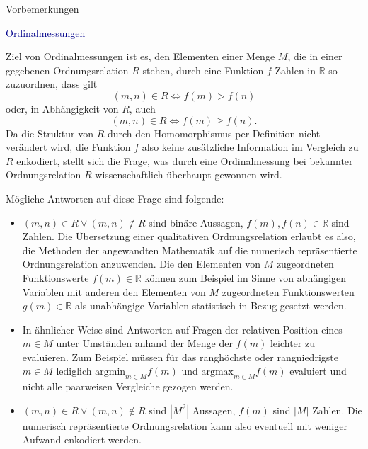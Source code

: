 \documentclass[
  8pt,
  ignorenonframetext,
]{beamer}
\providecommand{\tightlist}{%
  \setlength{\itemsep}{0pt}\setlength{\parskip}{0pt}}
\begin{document}
\begin{frame}{Vorbemerkungen}
\protect\hypertarget{vorbemerkungen-3}{}
\vspace{1mm}

\textcolor{darkblue}{Ordinalmessungen}

\footnotesize

Ziel von Ordinalmessungen ist es, den Elementen einer Menge \(M\), die
in einer gegebenen Ordnungsrelation \(R\) stehen, durch eine Funktion
\(f\) Zahlen in \(\mathbb{R}\) so zuzuordnen, dass gilt \begin{equation}
(m,n) \in R \Leftrightarrow f(m) > f(n)  
\end{equation} oder, in Abhängigkeit von \(R\), auch \begin{equation}
(m,n) \in R \Leftrightarrow f(m) \ge f(n).  
\end{equation} Da die Struktur von \(R\) durch den Homomorphismus per
Definition nicht verändert wird, die Funktion \(f\) also keine
zusätzliche Information im Vergleich zu \(R\) enkodiert, stellt sich die
Frage, was durch eine Ordinalmessung bei bekannter Ordnungsrelation
\(R\) wissenschaftlich überhaupt gewonnen wird.

Mögliche Antworten auf diese Frage sind folgende:

\begin{itemize}
\tightlist
\item
  \justifying \((m,n) \in R \vee (m,n) \notin R\) sind binäre Aussagen,
  \(f(m), f(n) \in \mathbb{R}\) sind Zahlen. Die Übersetzung einer
  qualitativen Ordnungsrelation erlaubt es also, die Methoden der
  angewandten Mathematik auf die numerisch repräsentierte
  Ordnungsrelation anzuwenden. Die den Elementen von \(M\) zugeordneten
  Funktionswerte \(f(m) \in \mathbb{R}\) können zum Beispiel im Sinne
  von abhängigen Variablen mit anderen den Elementen von \(M\)
  zugeordneten Funktionswerten \(g(m) \in \mathbb{R}\) als unabhängige
  Variablen statistisch in Bezug gesetzt werden.
\item
  In ähnlicher Weise sind Antworten auf Fragen der relativen Position
  eines \(m \in M\) unter Umständen anhand der Menge der \(f(m)\)
  leichter zu evaluieren. Zum Beispiel müssen für das ranghöchste oder
  rangniedrigste \(m \in M\) lediglich \(\mbox{argmin}_{m \in M}f(m)\)
  und \(\mbox{argmax}_{m \in M}f(m)\) evaluiert und nicht alle
  paarweisen Vergleiche gezogen werden.
\item
  \((m,n) \in R \vee (m,n) \notin R\) sind \(|M^2|\) Aussagen, \(f(m)\)
  sind \(|M|\) Zahlen. Die numerisch repräsentierte Ordnungsrelation
  kann also eventuell mit weniger Aufwand enkodiert werden.
\end{itemize}
\end{frame}
\end{document}
